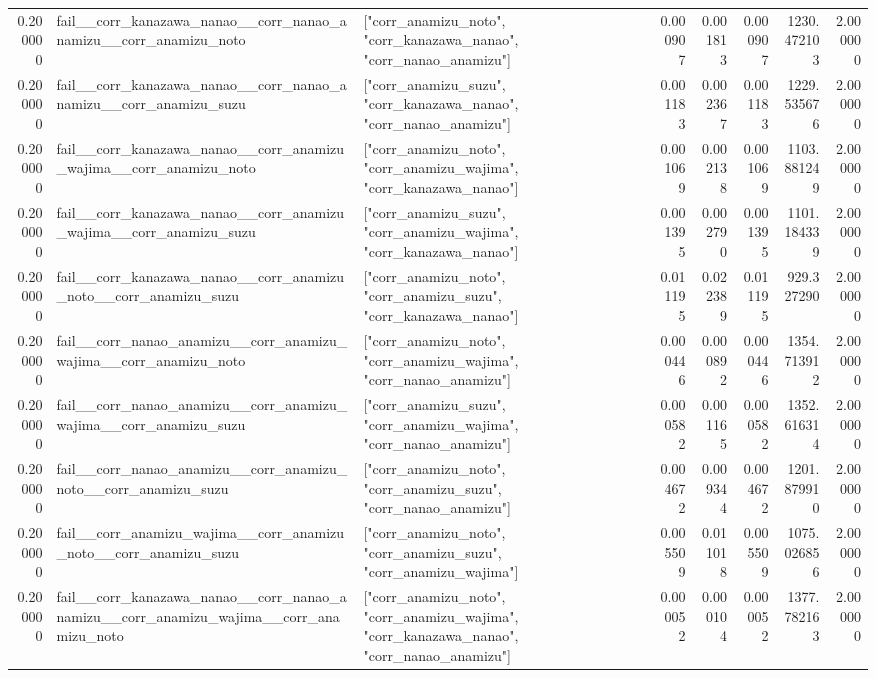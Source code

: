 \begin{tabular}{rllrrrrr}
0.200000 & fail\_\_corr\_kanazawa\_nanao\_\_corr\_nanao\_anamizu\_\_corr\_anamizu\_noto & ["corr\_anamizu\_noto", "corr\_kanazawa\_nanao", "corr\_nanao\_anamizu"] & 0.000907 & 0.001813 & 0.000907 & 1230.472103 & 2.000000 \\
0.200000 & fail\_\_corr\_kanazawa\_nanao\_\_corr\_nanao\_anamizu\_\_corr\_anamizu\_suzu & ["corr\_anamizu\_suzu", "corr\_kanazawa\_nanao", "corr\_nanao\_anamizu"] & 0.001183 & 0.002367 & 0.001183 & 1229.535676 & 2.000000 \\
0.200000 & fail\_\_corr\_kanazawa\_nanao\_\_corr\_anamizu\_wajima\_\_corr\_anamizu\_noto & ["corr\_anamizu\_noto", "corr\_anamizu\_wajima", "corr\_kanazawa\_nanao"] & 0.001069 & 0.002138 & 0.001069 & 1103.881249 & 2.000000 \\
0.200000 & fail\_\_corr\_kanazawa\_nanao\_\_corr\_anamizu\_wajima\_\_corr\_anamizu\_suzu & ["corr\_anamizu\_suzu", "corr\_anamizu\_wajima", "corr\_kanazawa\_nanao"] & 0.001395 & 0.002790 & 0.001395 & 1101.184339 & 2.000000 \\
0.200000 & fail\_\_corr\_kanazawa\_nanao\_\_corr\_anamizu\_noto\_\_corr\_anamizu\_suzu & ["corr\_anamizu\_noto", "corr\_anamizu\_suzu", "corr\_kanazawa\_nanao"] & 0.011195 & 0.022389 & 0.011195 & 929.327290 & 2.000000 \\
0.200000 & fail\_\_corr\_nanao\_anamizu\_\_corr\_anamizu\_wajima\_\_corr\_anamizu\_noto & ["corr\_anamizu\_noto", "corr\_anamizu\_wajima", "corr\_nanao\_anamizu"] & 0.000446 & 0.000892 & 0.000446 & 1354.713912 & 2.000000 \\
0.200000 & fail\_\_corr\_nanao\_anamizu\_\_corr\_anamizu\_wajima\_\_corr\_anamizu\_suzu & ["corr\_anamizu\_suzu", "corr\_anamizu\_wajima", "corr\_nanao\_anamizu"] & 0.000582 & 0.001165 & 0.000582 & 1352.616314 & 2.000000 \\
0.200000 & fail\_\_corr\_nanao\_anamizu\_\_corr\_anamizu\_noto\_\_corr\_anamizu\_suzu & ["corr\_anamizu\_noto", "corr\_anamizu\_suzu", "corr\_nanao\_anamizu"] & 0.004672 & 0.009344 & 0.004672 & 1201.879910 & 2.000000 \\
0.200000 & fail\_\_corr\_anamizu\_wajima\_\_corr\_anamizu\_noto\_\_corr\_anamizu\_suzu & ["corr\_anamizu\_noto", "corr\_anamizu\_suzu", "corr\_anamizu\_wajima"] & 0.005509 & 0.011018 & 0.005509 & 1075.026856 & 2.000000 \\
0.200000 & fail\_\_corr\_kanazawa\_nanao\_\_corr\_nanao\_anamizu\_\_corr\_anamizu\_wajima\_\_corr\_anamizu\_noto & ["corr\_anamizu\_noto", "corr\_anamizu\_wajima", "corr\_kanazawa\_nanao", "corr\_nanao\_anamizu"] & 0.000052 & 0.000104 & 0.000052 & 1377.782163 & 2.000000 \\

\end{tabular}
